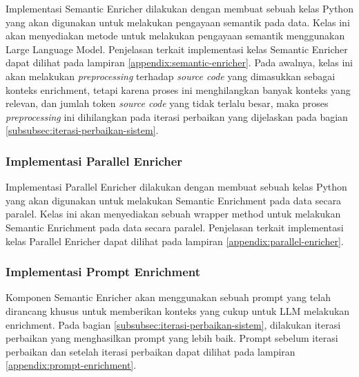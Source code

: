 Implementasi Semantic Enricher dilakukan dengan membuat sebuah kelas Python yang akan digunakan untuk melakukan pengayaan semantik pada data. Kelas ini akan menyediakan metode untuk melakukan pengayaan semantik menggunakan Large Language Model. Penjelasan terkait implementasi kelas Semantic Enricher dapat dilihat pada lampiran \ref{appendix:semantic-enricher}. Pada awalnya, kelas ini akan melakukan \textit{preprocessing} terhadap \textit{source code} yang dimasukkan sebagai konteks enrichment, tetapi karena proses ini menghilangkan banyak konteks yang relevan, dan jumlah token \textit{source code} yang tidak terlalu besar, maka proses \textit{preprocessing} ini dihilangkan pada iterasi perbaikan yang dijelaskan pada bagian \ref{subsubsec:iterasi-perbaikan-sistem}.

\subsubsection{Implementasi Parallel Enricher}

Implementasi Parallel Enricher dilakukan dengan membuat sebuah kelas Python yang akan digunakan untuk melakukan Semantic Enrichment pada data secara paralel. Kelas ini akan menyediakan sebuah wrapper method untuk melakukan Semantic Enrichment pada data secara paralel. Penjelasan terkait implementasi kelas Parallel Enricher dapat dilihat pada lampiran \ref{appendix:parallel-enricher}.

\subsubsection{Implementasi Prompt Enrichment}

Komponen Semantic Enricher akan menggunakan sebuah prompt yang telah dirancang khusus untuk memberikan konteks yang cukup untuk LLM melakukan enrichment. Pada bagian \ref{subsubsec:iterasi-perbaikan-sistem}, dilakukan iterasi perbaikan yang menghasilkan prompt yang lebih baik. Prompt sebelum iterasi perbaikan dan setelah iterasi perbaikan dapat dilihat pada lampiran \ref{appendix:prompt-enrichment}.



